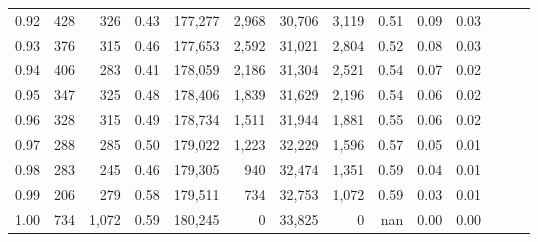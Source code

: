 \begin{tabular}{rrrrrrrrrrrrrr}
0.92 &    428 &    326 &  0.43 &  177,277 &    2,968 &  30,706 &   3,119 &  0.51 &  0.09 &      0.03 \\
0.93 &    376 &    315 &  0.46 &  177,653 &    2,592 &  31,021 &   2,804 &  0.52 &  0.08 &      0.03 \\
0.94 &    406 &    283 &  0.41 &  178,059 &    2,186 &  31,304 &   2,521 &  0.54 &  0.07 &      0.02 \\
0.95 &    347 &    325 &  0.48 &  178,406 &    1,839 &  31,629 &   2,196 &  0.54 &  0.06 &      0.02 \\
0.96 &    328 &    315 &  0.49 &  178,734 &    1,511 &  31,944 &   1,881 &  0.55 &  0.06 &      0.02 \\
0.97 &    288 &    285 &  0.50 &  179,022 &    1,223 &  32,229 &   1,596 &  0.57 &  0.05 &      0.01 \\
0.98 &    283 &    245 &  0.46 &  179,305 &      940 &  32,474 &   1,351 &  0.59 &  0.04 &      0.01 \\
0.99 &    206 &    279 &  0.58 &  179,511 &      734 &  32,753 &   1,072 &  0.59 &  0.03 &      0.01 \\
1.00 &    734 &  1,072 &  0.59 &  180,245 &        0 &  33,825 &       0 &   nan &  0.00 &      0.00 \\
\bottomrule
\end{tabular}
